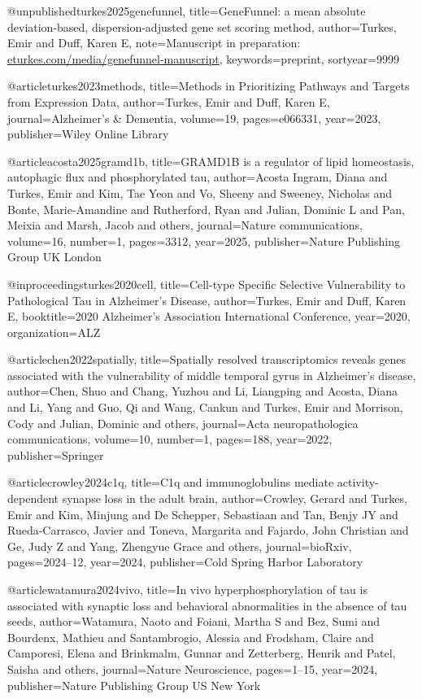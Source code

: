 @unpublished{turkes2025genefunnel,
  title={GeneFunnel: a mean absolute deviation-based, dispersion-adjusted gene set scoring method},
  author={Turkes, Emir and Duff, Karen E},
  note={Manuscript in preparation: \href{https://eturkes.com/media/genefunnel-manuscript/}{eturkes.com/media/genefunnel-manuscript}},
  keywords={preprint},
  sortyear={9999}
}

@article{turkes2023methods,
  title={Methods in Prioritizing Pathways and Targets from Expression Data},
  author={Turkes, Emir and Duff, Karen E},
  journal={Alzheimer's \& Dementia},
  volume={19},
  pages={e066331},
  year={2023},
  publisher={Wiley Online Library}
}

@article{acosta2025gramd1b,
  title={GRAMD1B is a regulator of lipid homeostasis, autophagic flux and phosphorylated tau},
  author={Acosta Ingram, Diana and Turkes, Emir and Kim, Tae Yeon and Vo, Sheeny and Sweeney, Nicholas and Bonte, Marie-Amandine and Rutherford, Ryan and Julian, Dominic L and Pan, Meixia and Marsh, Jacob and others},
  journal={Nature communications},
  volume={16},
  number={1},
  pages={3312},
  year={2025},
  publisher={Nature Publishing Group UK London}
}

@inproceedings{turkes2020cell,
  title={Cell-type Specific Selective Vulnerability to Pathological Tau in Alzheimer's Disease},
  author={Turkes, Emir and Duff, Karen E},
  booktitle={2020 Alzheimer's Association International Conference},
  year={2020},
  organization={ALZ}
}

@article{chen2022spatially,
  title={Spatially resolved transcriptomics reveals genes associated with the vulnerability of middle temporal gyrus in Alzheimer’s disease},
  author={Chen, Shuo and Chang, Yuzhou and Li, Liangping and Acosta, Diana and Li, Yang and Guo, Qi and Wang, Cankun and Turkes, Emir and Morrison, Cody and Julian, Dominic and others},
  journal={Acta neuropathologica communications},
  volume={10},
  number={1},
  pages={188},
  year={2022},
  publisher={Springer}
}

@article{crowley2024c1q,
  title={C1q and immunoglobulins mediate activity-dependent synapse loss in the adult brain},
  author={Crowley, Gerard and Turkes, Emir and Kim, Minjung and De Schepper, Sebastiaan and Tan, Benjy JY and Rueda-Carrasco, Javier and Toneva, Margarita and Fajardo, John Christian and Ge, Judy Z and Yang, Zhengyue Grace and others},
  journal={bioRxiv},
  pages={2024--12},
  year={2024},
  publisher={Cold Spring Harbor Laboratory}
}

@article{watamura2024vivo,
  title={In vivo hyperphosphorylation of tau is associated with synaptic loss and behavioral abnormalities in the absence of tau seeds},
  author={Watamura, Naoto and Foiani, Martha S and Bez, Sumi and Bourdenx, Mathieu and Santambrogio, Alessia and Frodsham, Claire and Camporesi, Elena and Brinkmalm, Gunnar and Zetterberg, Henrik and Patel, Saisha and others},
  journal={Nature Neuroscience},
  pages={1--15},
  year={2024},
  publisher={Nature Publishing Group US New York}
}

